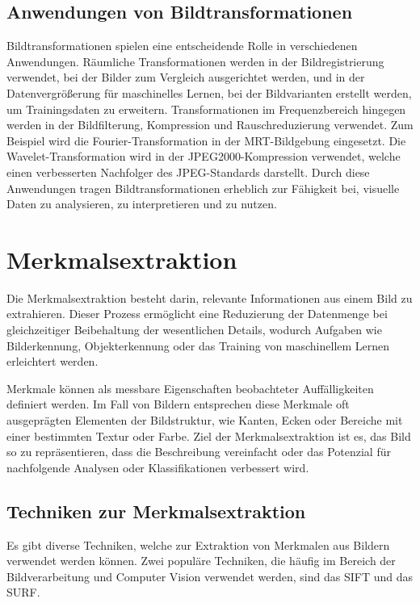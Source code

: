 \subsection{Anwendungen von Bildtransformationen}
Bildtransformationen spielen eine entscheidende Rolle in verschiedenen Anwendungen. Räumliche Transformationen werden in der Bildregistrierung verwendet, 
bei der Bilder zum Vergleich ausgerichtet werden, und in der Datenvergrößerung für maschinelles Lernen, bei der Bildvarianten erstellt werden, 
um Trainingsdaten zu erweitern. 
Transformationen im Frequenzbereich hingegen werden in der Bildfilterung, Kompression und Rauschreduzierung verwendet.
Zum Beispiel wird die Fourier-Transformation in der MRT-Bildgebung eingesetzt. Die Wavelet-Transformation wird in der JPEG2000-Kompression verwendet, welche 
einen verbesserten Nachfolger des JPEG-Standards darstellt.
Durch diese Anwendungen tragen Bildtransformationen erheblich zur Fähigkeit bei, visuelle Daten zu analysieren, zu interpretieren und zu nutzen.~\cite{H._Burkhardt_uni-freiburg}

\section{Merkmalsextraktion}
Die Merkmalsextraktion besteht darin, relevante Informationen aus einem Bild zu extrahieren. Dieser Prozess ermöglicht eine Reduzierung 
der Datenmenge bei gleichzeitiger Beibehaltung der wesentlichen Details, wodurch Aufgaben wie Bilderkennung, 
Objekterkennung oder das Training von maschinellem Lernen erleichtert werden.

Merkmale können als messbare Eigenschaften beobachteter Auffälligkeiten definiert werden. Im Fall von Bildern entsprechen diese Merkmale 
oft ausgeprägten Elementen der Bildstruktur, wie Kanten, Ecken oder Bereiche mit einer bestimmten Textur oder Farbe. 
Ziel der Merkmalsextraktion ist es, das Bild so zu repräsentieren, dass die Beschreibung vereinfacht oder das Potenzial 
für nachfolgende Analysen oder Klassifikationen verbessert wird.~\cite{Shambhavi_Jain_2017_ieee}

\subsection{Techniken zur Merkmalsextraktion}
Es gibt diverse Techniken, welche zur Extraktion von Merkmalen aus Bildern verwendet werden können. 
Zwei populäre Techniken, die häufig im Bereich der Bildverarbeitung und Computer Vision verwendet werden, 
sind das \ac{SIFT} und das \ac{SURF}.~\cite{Shambhavi_Jain_2017_ieee}

